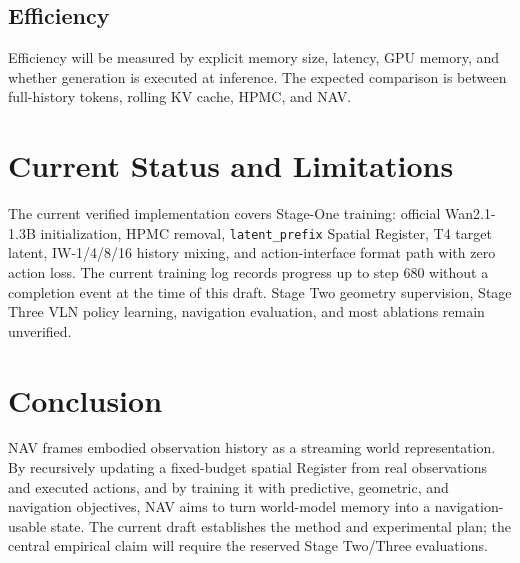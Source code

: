 \documentclass[11pt,a4paper]{ctexart}
\newcommand{\method}{NAV}
\begin{document}
\subsection{Efficiency}

Efficiency will be measured by explicit memory size, latency, GPU memory, and whether generation is executed at inference. The expected comparison is between full-history tokens, rolling KV cache, HPMC, and \method{}.

\section{Current Status and Limitations}

The current verified implementation covers Stage-One training: official Wan2.1-1.3B initialization, HPMC removal, \texttt{latent\_prefix} Spatial Register, T4 target latent, IW-1/4/8/16 history mixing, and action-interface format path with zero action loss. The current training log records progress up to step 680 without a completion event at the time of this draft. Stage Two geometry supervision, Stage Three VLN policy learning, navigation evaluation, and most ablations remain unverified.

\section{Conclusion}

\method{} frames embodied observation history as a streaming world representation. By recursively updating a fixed-budget spatial Register from real observations and executed actions, and by training it with predictive, geometric, and navigation objectives, \method{} aims to turn world-model memory into a navigation-usable state. The current draft establishes the method and experimental plan; the central empirical claim will require the reserved Stage Two/Three evaluations.
\end{document}
